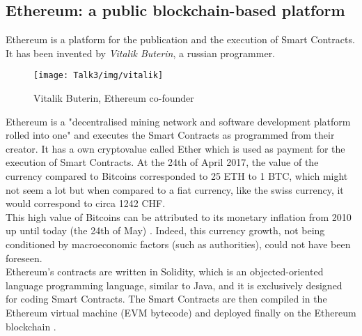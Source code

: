 \subsection{Ethereum: a public blockchain-based platform}
Ethereum is a platform for the publication and the execution of Smart Contracts.
It has been invented by \textit{Vitalik Buterin}, a russian programmer. 
           \begin{figure}[H]
         \begin{center}
         \texttt{[image: Talk3/img/vitalik]}
         \end{center}
         \caption{Vitalik Buterin, Ethereum co-founder}
         \label{label}
       \end{figure}


Ethereum is a "decentralised mining network and software development platform rolled into one" \cite{vitalin} and executes the Smart Contracts as programmed from their creator.
It has a own cryptovalue called Ether which is used as payment for the execution of Smart Contracts.
At the 24th of April 2017, the value of the currency compared to Bitcoins corresponded to 25 ETH to 1 BTC, which might not seem a lot but when compared to a fiat currency, like the swiss currency, it would correspond to circa 1242 CHF.\\
This high value of Bitcoins can be attributed to its monetary inflation from 2010 up until today (the 24th of May) \cite{BitcoinsPriceCharts}. Indeed, this currency growth, not being conditioned by macroeconomic factors (such as authorities), could not have been foreseen. \\
Ethereum's contracts are written in Solidity, which is an objected-oriented language programming language, similar to Java, and it is exclusively designed for coding Smart Contracts.
The Smart Contracts are then compiled in the Ethereum virtual machine (EVM bytecode) and deployed finally on the Ethereum blockchain \cite{paper2}. 

